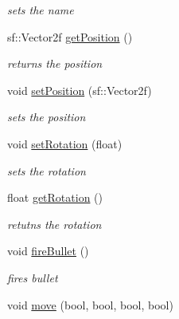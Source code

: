 \begin{DoxyCompactItemize}
\begin{DoxyCompactList}\small\item\em sets the name \end{DoxyCompactList}\item 
\hypertarget{class_player_a23356f99a9de86d3d47eadb679b332dc}{sf\+::\+Vector2f \hyperlink{class_player_a23356f99a9de86d3d47eadb679b332dc}{get\+Position} ()}\label{class_player_a23356f99a9de86d3d47eadb679b332dc}

\begin{DoxyCompactList}\small\item\em returns the position \end{DoxyCompactList}\item 
\hypertarget{class_player_a64b65de6130f811ce670be4b0ca790b4}{void \hyperlink{class_player_a64b65de6130f811ce670be4b0ca790b4}{set\+Position} (sf\+::\+Vector2f)}\label{class_player_a64b65de6130f811ce670be4b0ca790b4}

\begin{DoxyCompactList}\small\item\em sets the position \end{DoxyCompactList}\item 
\hypertarget{class_player_a9abb9782f40f4208993222906afac9a0}{void \hyperlink{class_player_a9abb9782f40f4208993222906afac9a0}{set\+Rotation} (float)}\label{class_player_a9abb9782f40f4208993222906afac9a0}

\begin{DoxyCompactList}\small\item\em sets the rotation \end{DoxyCompactList}\item 
\hypertarget{class_player_aa2890f51b31e33f439f6bd67092168f7}{float \hyperlink{class_player_aa2890f51b31e33f439f6bd67092168f7}{get\+Rotation} ()}\label{class_player_aa2890f51b31e33f439f6bd67092168f7}

\begin{DoxyCompactList}\small\item\em retutns the rotation \end{DoxyCompactList}\item 
\hypertarget{class_player_a5128ce9f009eff82f09c53f692fa33a4}{void \hyperlink{class_player_a5128ce9f009eff82f09c53f692fa33a4}{fire\+Bullet} ()}\label{class_player_a5128ce9f009eff82f09c53f692fa33a4}

\begin{DoxyCompactList}\small\item\em fires bullet \end{DoxyCompactList}\item 
\hypertarget{class_player_aba810e10a4baa196333792ee5bebbbb7}{void \hyperlink{class_player_aba810e10a4baa196333792ee5bebbbb7}{move} (bool, bool, bool, bool)}\label{class_player_aba810e10a4baa196333792ee5bebbbb7}


\end{DoxyCompactItemize}
